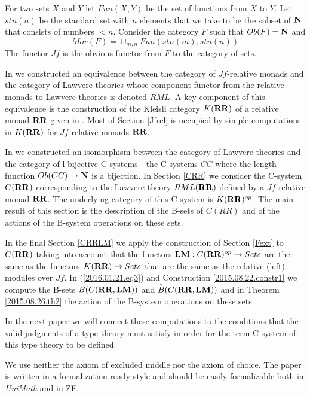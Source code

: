 \documentclass[12pt]{amsart}
\newcommand{\sr}{\rightarrow}
\newcommand{\nn}{{\bf N\rm}}
\newcommand{\nat}{\nn}
\newcommand{\wt}{\widetilde}
\newcommand{\RR}{{\bf RR}}
\newcommand{\LM}{{\bf LM}}
\begin{document}
For two sets $X$ and $Y$ let $Fun(X,Y)$ be the set of functions from $X$ to
$Y$.  Let $stn(n)$ be the standard set with $n$ elements that we take to be the
subset of $\nat$ that consists of numbers $<n$. Consider the category $F$ such
that $Ob(F)=\nn$ and
%
$$Mor(F)=\cup_{m,n}Fun(stn(m),stn(n))$$
%
The functor $Jf$ is the obvious functor from $F$ to the category of sets. 

In \cite{LandJf} we constructed an equivalence between the category of
$Jf$-relative monads and the category of Lawvere theories whose component
functor from the relative monads to Lawvere theories is denoted $RML$. A key
component of this equivalence is the construction of the Kleisli category
$K(\RR)$ of a relative monad $\RR$ given in \cite{ACU2}.  Most of Section
\ref{Jfrel} is occupied by simple computations in $K(\RR)$ for $Jf$-relative
monads $\RR$.

In \cite{LandC} we constructed an isomorphism between the category of Lawvere
theories and the category of l-bijective C-systems---the C-systems $CC$ where
the length function $Ob(CC)\sr \nat$ is a bijection. In Section \ref{CRR} we
consider the C-system $C(\RR)$ corresponding to the Lawvere theory $RML(\RR)$
defined by a $Jf$-relative monad $\RR$. The underlying category of this
C-system is $K(\RR)^{op}$. The main result of this section is the description
of the B-sets of $C(RR)$ and of the actions of the B-system operations on these
sets.

In the final Section \ref{CRRLM} we apply the construction of Section
\ref{Fext} to $C(\RR)$ taking into account that the functors
$\LM:C(\RR)^{op}\sr Sets$ are the same as the functors $K(\RR)\sr Sets$ that
are the same as the relative (left) modules over $Jf$. In
(\ref{2016.01.21.eq3}) and Construction \ref{2015.08.22.constr1} we compute the
B-sets $B(C(\RR,\LM))$ and $\wt{B}(C(\RR,\LM))$ and in Theorem
\ref{2015.08.26.th2} the action of the B-system operations on these sets.

In the next paper we will connect these computations to the conditions that the
valid judgments of a type theory must satisfy in order for the term C-system
of this type theory to be defined.

\vspace{5mm}

We use neither the axiom of excluded middle nor the axiom of choice. The paper
is written in a formalization-ready style and should be easily formalizable
both in {\em UniMath} and in ZF.

\vspace{5mm}
\end{document}
